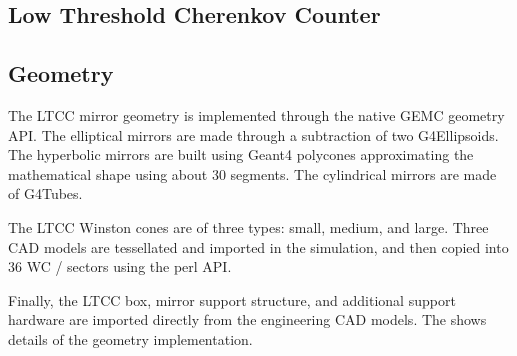 \subsection{Low Threshold Cherenkov Counter}

\subsection{Geometry}
The LTCC mirror geometry is implemented through the native GEMC geometry API. The elliptical mirrors are made through a subtraction of
two G4Ellipsoids. The hyperbolic mirrors are built using Geant4 polycones approximating the mathematical shape using about 30 segments.
The cylindrical mirrors are made of G4Tubes.

The LTCC Winston cones are of three types: small, medium, and large. Three CAD models are tessellated and imported in the simulation, and
then copied into 36 WC / sectors using the perl API.

Finally, the LTCC box, mirror support structure, and additional support hardware are imported directly from the engineering CAD models.
The  shows details of the geometry implementation.

